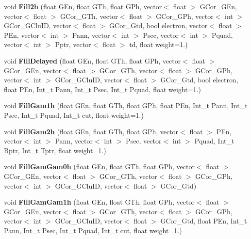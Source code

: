 \begin{DoxyCompactItemize}
\mbox{\label{classhists_a84e3dd3dc98652844bbfea63652eb280}} 
void {\bfseries Fill2h} (float G\+En, float G\+Th, float G\+Ph, vector$<$ float $>$ G\+Cor\+\_\+\+G\+En, vector$<$ float $>$ G\+Cor\+\_\+\+G\+Th, vector$<$ float $>$ G\+Cor\+\_\+\+G\+Ph, vector$<$ int $>$ G\+Cor\+\_\+\+G\+Clu\+ID, vector$<$ float $>$ G\+Cor\+\_\+\+Gtd, bool electron, vector$<$ float $>$ P\+En, vector$<$ int $>$ Pann, vector$<$ int $>$ Psec, vector$<$ int $>$ Pquad, vector$<$ int $>$ Pptr, vector$<$ float $>$ td, float weight=1.)
\item 
\mbox{\label{classhists_a506c5e4b0014fe8c5bab39bdc2d09d76}} 
void {\bfseries Fill\+Delayed} (float G\+En, float G\+Th, float G\+Ph, vector$<$ float $>$ G\+Cor\+\_\+\+G\+En, vector$<$ float $>$ G\+Cor\+\_\+\+G\+Th, vector$<$ float $>$ G\+Cor\+\_\+\+G\+Ph, vector$<$ int $>$ G\+Cor\+\_\+\+G\+Clu\+ID, vector$<$ float $>$ G\+Cor\+\_\+\+Gtd, bool electron, float P\+En, Int\+\_\+t Pann, Int\+\_\+t Psec, Int\+\_\+t Pquad, float weight=1.)
\item 
\mbox{\label{classhists_a978ae6d9269b5aa0a26365899d3047b2}} 
void {\bfseries Fill\+Gam1h} (float G\+En, float G\+Th, float G\+Ph, float P\+En, Int\+\_\+t Pann, Int\+\_\+t Psec, Int\+\_\+t Pquad, Int\+\_\+t cut, float weight=1.)
\item 
\mbox{\label{classhists_a37e85d4eeab8262c6809d003d83d220e}} 
void {\bfseries Fill\+Gam2h} (float G\+En, float G\+Th, float G\+Ph, vector$<$ float $>$ P\+En, vector$<$ int $>$ Pann, vector$<$ int $>$ Psec, vector$<$ int $>$ Pquad, Int\+\_\+t Bptr, Int\+\_\+t Tptr, float weight=1.)
\item 
\mbox{\label{classhists_a02f8be4691d9c9c5aae56b29144d4878}} 
void {\bfseries Fill\+Gam\+Gam0h} (float G\+En, float G\+Th, float G\+Ph, vector$<$ float $>$ G\+Cor\+\_\+\+G\+En, vector$<$ float $>$ G\+Cor\+\_\+\+G\+Th, vector$<$ float $>$ G\+Cor\+\_\+\+G\+Ph, vector$<$ int $>$ G\+Cor\+\_\+\+G\+Clu\+ID, vector$<$ float $>$ G\+Cor\+\_\+\+Gtd)
\item 
\mbox{\label{classhists_a7d1b75d24747c89c343d15c8826b3ecb}} 
void {\bfseries Fill\+Gam\+Gam1h} (float G\+En, float G\+Th, float G\+Ph, vector$<$ float $>$ G\+Cor\+\_\+\+G\+En, vector$<$ float $>$ G\+Cor\+\_\+\+G\+Th, vector$<$ float $>$ G\+Cor\+\_\+\+G\+Ph, vector$<$ int $>$ G\+Cor\+\_\+\+G\+Clu\+ID, vector$<$ float $>$ G\+Cor\+\_\+\+Gtd, float P\+En, Int\+\_\+t Pann, Int\+\_\+t Psec, Int\+\_\+t Pquad, Int\+\_\+t cut, float weight=1.)

\end{DoxyCompactItemize}
